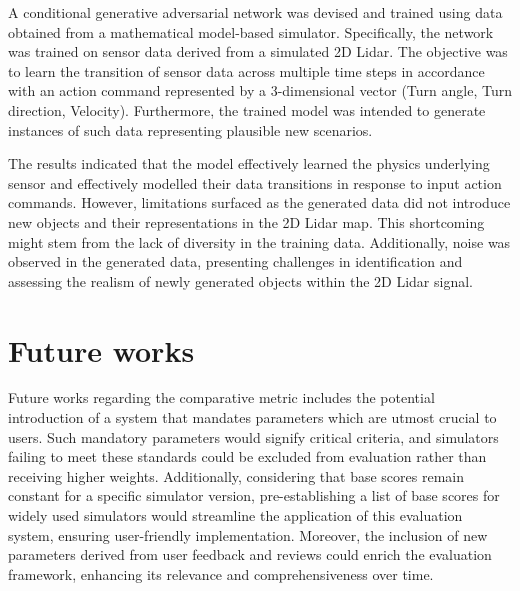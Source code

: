 \documentclass[12pt,twoside,a4paper,parskip]{scrbook} %
\begin{document}
A conditional generative adversarial network was devised and trained using data obtained from a mathematical model-based simulator. Specifically, the network was trained on sensor data derived from a simulated 2D Lidar. The objective was to learn the transition of sensor data across multiple time steps in accordance with an action command represented by a 3-dimensional vector (Turn angle, Turn direction, Velocity). Furthermore, the trained model was intended to generate instances of such data representing plausible new scenarios.

The results indicated that the model effectively learned the physics underlying sensor and effectively modelled their data transitions in response to input action commands. However, limitations surfaced as the generated data did not introduce new objects and their representations in the 2D Lidar map. This shortcoming might stem from the lack of diversity in the training data. Additionally, noise was observed in the generated data, presenting challenges in identification and assessing the realism of newly generated objects within the 2D Lidar signal.


\chapter{Future works}
Future works regarding the comparative metric includes the potential introduction of a system that mandates parameters which are utmost crucial to users. Such mandatory parameters would signify critical criteria, and simulators failing to meet these standards could be excluded from evaluation rather than receiving higher weights. Additionally, considering that base scores remain constant for a specific simulator version, pre-establishing a list of base scores for widely used simulators would streamline the application of this evaluation system, ensuring user-friendly implementation. Moreover, the inclusion of new parameters derived from user feedback and reviews could enrich the evaluation framework, enhancing its relevance and comprehensiveness over time.
\end{document}
